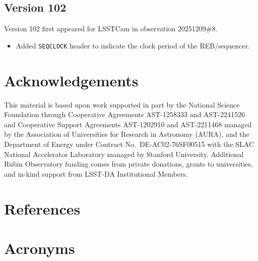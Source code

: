 \documentclass[OPS,lsstdraft,authoryear,toc]{lsstdoc}
\begin{document}
\subsection{Version 102}

Version 102 first appeared for LSSTCam in observation 20251209\#8.

\begin{itemize}
  \item Added \texttt{SEQCLOCK} header to indicate the clock period of the REB/sequencer.
\end{itemize}

\section{Acknowledgements}

This material is based upon work supported in part by the National Science Foundation through Cooperative Agreements AST-1258333 and AST-2241526 and Cooperative Support Agreements AST-1202910 and AST-2211468 managed by the Association of Universities for Research in Astronomy (AURA), and the Department of Energy under Contract No.\ DE-AC02-76SF00515 with the SLAC National Accelerator Laboratory managed by Stanford University.
Additional Rubin Observatory funding comes from private donations, grants to universities, and in-kind support from LSST-DA Institutional Members.

\section{References} \label{sec:bib}
\renewcommand{\refname}{} %


\section{Acronyms} \label{sec:acronyms}

\end{document}
